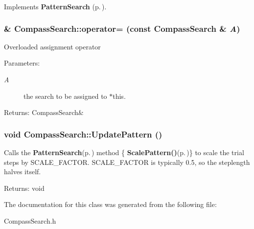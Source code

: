 Implements {\bf Pattern\-Search} {\rm (p.\,\pageref{classPatternSearch_b1})}.
\subsubsection{\& Compass\-Search::operator= (const {\bf Compass\-Search} \& {\em A})}\label{classCompassSearch_z5_0}


Overloaded assignment operator \begin{Desc}
\item[Parameters:]
\begin{description}
\item[{\em A}]the search to be assigned to $\ast$this. \end{description}
\end{Desc}
\begin{Desc}
\item[Returns:]Compass\-Search\& \end{Desc}
\subsubsection{\setlength{\rightskip}{0pt plus 5cm}void Compass\-Search::Update\-Pattern ()\hspace{0.3cm}{\tt  [protected]}}\label{classCompassSearch_b2}


Calls the {\bf Pattern\-Search}{\rm (p.\,\pageref{classPatternSearch})} method \{ {\bf Scale\-Pattern()}{\rm (p.\,\pageref{classPatternSearch_b5})}\} to scale the trial steps by SCALE\_\-FACTOR. SCALE\_\-FACTOR is typically 0.5, so the steplength halves itself. \begin{Desc}
\item[Returns:]void \end{Desc}


The documentation for this class was generated from the following file:\begin{CompactItemize}
\item 
Compass\-Search.h\end{CompactItemize}
